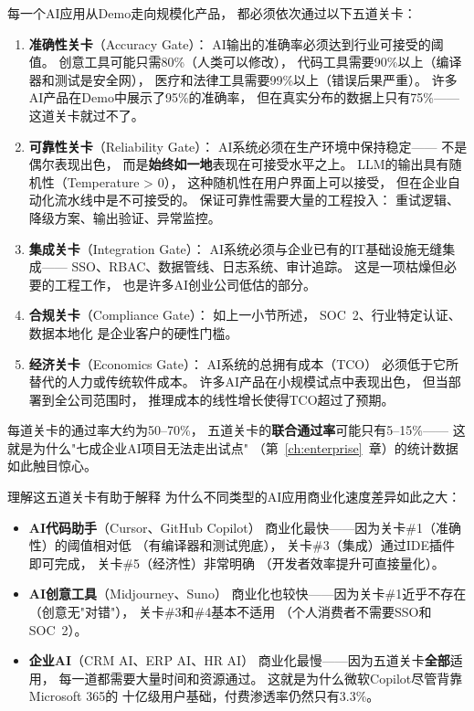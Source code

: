 \begin{corebox}
每一个AI应用从Demo走向规模化产品，
都必须依次通过以下五道关卡：

\begin{enumerate}
  \item \textbf{准确性关卡}（Accuracy Gate）：
    AI输出的准确率必须达到行业可接受的阈值。
    创意工具可能只需80\%（人类可以修改），
    代码工具需要90\%以上（编译器和测试是安全网），
    医疗和法律工具需要99\%以上（错误后果严重）。
    许多AI产品在Demo中展示了95\%的准确率，
    但在真实分布的数据上只有75\%——这道关卡就过不了。

  \item \textbf{可靠性关卡}（Reliability Gate）：
    AI系统必须在生产环境中保持稳定——
    不是偶尔表现出色，
    而是\textbf{始终如一地}表现在可接受水平之上。
    LLM的输出具有随机性（Temperature > 0），
    这种随机性在用户界面上可以接受，
    但在企业自动化流水线中是不可接受的。
    保证可靠性需要大量的工程投入：
    重试逻辑、降级方案、输出验证、异常监控。

  \item \textbf{集成关卡}（Integration Gate）：
    AI系统必须与企业已有的IT基础设施无缝集成——
    SSO、RBAC、数据管线、日志系统、审计追踪。
    这是一项枯燥但必要的工程工作，
    也是许多AI创业公司低估的部分。

  \item \textbf{合规关卡}（Compliance Gate）：
    如上一小节所述，
    SOC~2、行业特定认证、数据本地化
    是企业客户的硬性门槛。

  \item \textbf{经济关卡}（Economics Gate）：
    AI系统的总拥有成本（TCO）
    必须低于它所替代的人力或传统软件成本。
    许多AI产品在小规模试点中表现出色，
    但当部署到全公司范围时，
    推理成本的线性增长使得TCO超过了预期。
\end{enumerate}

\medskip
\noindent 每道关卡的通过率大约为50--70\%，
五道关卡的\textbf{联合通过率}可能只有5--15\%——
这就是为什么"七成企业AI项目无法走出试点"
（第~\ref{ch:enterprise}~章）的统计数据如此触目惊心。
\end{corebox}

理解这五道关卡有助于解释
为什么不同类型的AI应用商业化速度差异如此之大：

\begin{itemize}
  \item \textbf{AI代码助手}（Cursor、GitHub Copilot）
    商业化最快——因为关卡\#1（准确性）的阈值相对低
    （有编译器和测试兜底），
    关卡\#3（集成）通过IDE插件即可完成，
    关卡\#5（经济性）非常明确
    （开发者效率提升可直接量化）。

  \item \textbf{AI创意工具}（Midjourney、Suno）
    商业化也较快——因为关卡\#1近乎不存在
    （创意无"对错"），
    关卡\#3和\#4基本不适用
    （个人消费者不需要SSO和SOC~2）。

  \item \textbf{企业AI}（CRM AI、ERP AI、HR AI）
    商业化最慢——因为五道关卡\textbf{全部}适用，
    每一道都需要大量时间和资源通过。
    这就是为什么微软Copilot尽管背靠Microsoft 365的
    十亿级用户基础，付费渗透率仍然只有3.3\%。
\end{itemize}

